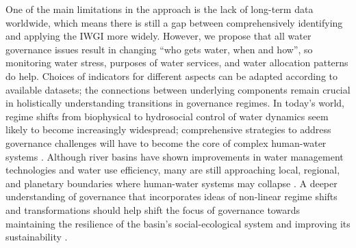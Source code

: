 One of the main limitations in the approach is the lack of long-term data worldwide, which means there is still a gap between comprehensively identifying and applying the IWGI more widely.
However, we propose that all water governance issues result in changing ``who gets water, when and how'', so monitoring water stress, purposes of water services, and water allocation patterns do help.
Choices of indicators for different aspects can be adapted according to available datasets; the connections between underlying components remain crucial in holistically understanding transitions in governance regimes.
In today's world, regime shifts from biophysical to hydrosocial control of water dynamics seem likely to become increasingly widespread; comprehensive strategies to address governance challenges will have to become the core of complex human-water systems
\cite{cumming2018,cumming2014,jaeger2019}.
Although river basins have shown improvements in water management technologies and water use efficiency, many are still approaching local, regional, and planetary boundaries where human-water systems may collapse
\cite{gleeson2020, wang-erlandsson2022}.
A deeper understanding of governance that incorporates ideas of non-linear regime shifts and transformations should help shift the focus of governance towards maintaining the resilience of the basin’s social-ecological system and improving its sustainability
\cite{falkenmark2019}.
